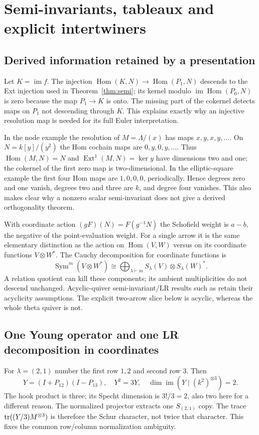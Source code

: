 \chapter{Semi-invariants, tableaux and explicit intertwiners}
\section{Derived information retained by a presentation}
Let $K=\operatorname{im}f$. The injection $\operatorname{Hom}(K,N)\to\operatorname{Hom}(P_1,N)$ descends to the Ext injection used in Theorem~\ref{thm:semi}; its kernel modulo $\operatorname{im}\operatorname{Hom}(P_0,N)$ is zero because the map $P_1\to K$ is onto. The missing part of the cokernel detects maps on $P_1$ not descending through $K$. This explains exactly why an injective resolution map is needed for its full Euler interpretation.

In the node example the resolution of $M=\Lambda/(x)$ has maps $x,y,x,y,\ldots$. On $N=k[y]/(y^2)$ the Hom cochain maps are $0,y,0,y,\ldots$. Thus $\operatorname{Hom}(M,N)=N$ and $\operatorname{Ext}^1(M,N)=\ker y$ have dimensions two and one; the cokernel of the first zero map is two-dimensional. In the elliptic-square example the first four Hom maps are $1,0,0,0$, periodically. Hence degrees zero and one vanish, degrees two and three are $k$, and degree four vanishes. This also makes clear why a nonzero scalar semi-invariant does not give a derived orthogonality theorem.

With coordinate action $(gF)(N)=F(g^{-1}N)$ the Schofield weight is $a-b$, the negative of the point-evaluation weight. For a single arrow it is the same elementary distinction as the action on $\operatorname{Hom}(V,W)$ versus on its coordinate functions $V\otimes W^*$. The Cauchy decomposition for coordinate functions is
\[
 \operatorname{Sym}^m(V\otimes W^*)\cong
 \bigoplus_{\lambda\vdash m}S_\lambda(V)\otimes S_\lambda(W)^*.
\]
A relation quotient can kill these components; its ambient multiplicities do not descend unchanged. Acyclic-quiver semi-invariant/LR results such as \cite{DerksenWeyman} retain their acyclicity assumptions. The explicit two-arrow slice below is acyclic, whereas the whole theta quiver is not.

\section{One Young operator and one LR decomposition in coordinates}
For $\lambda=(2,1)$ number the first row $1,2$ and second row $3$. Then
\[
 Y=(I+P_{12})(I-P_{13}),\quad Y^2=3Y,\quad
 \dim\operatorname{im}(Y\mid(k^2)^{\otimes3})=2.
\]
The hook product is three; its Specht dimension is $3!/3=2$, also two here for a different reason. The normalized projector extracts one $S_{(2,1)}$ copy. The trace $\operatorname{tr}((Y/3)M^{\otimes3})$ is therefore the Schur character, not twice that character. This fixes the common row/column normalization ambiguity.

